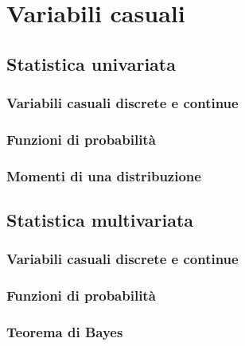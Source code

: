 
\chapter{Variabili casuali}
\section{Statistica univariata}
\subsection{Variabili casuali discrete e continue}
\subsection{Funzioni di probabilità}
\subsection{Momenti di una distribuzione}

\section{Statistica multivariata}
\subsection{Variabili casuali discrete e continue}

\subsection{Funzioni di probabilità}
\subsection{Teorema di Bayes}\label{ch:bayes-thm}
